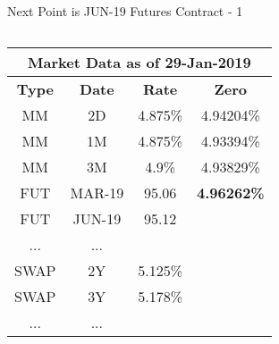\documentclass[handout, aspectratio=169]{beamer}
\begin{document}
\begin{frame}{Next Point is JUN-19 Futures Contract - 1}
	\begin{columns}[T]
		\begin{column}{0.4\textwidth}
			\begin{table}[t]
				\centering
				\begin{adjustbox}{max width=\textwidth, max height=\textheight}
					\begin{tabular}{|c|c|c|c|} 
						\hline
						\multicolumn{4}{|c|}{\textbf{Market Data as of 29-Jan-2019}} \\
						\hline
						\textbf{Type} & \textbf{Date}  & \textbf{Rate} & \textbf{Zero}\\				
						\hline
						MM & 2D & 4.875\% & 4.94204\% \\
						MM & 1M & 4.875\% & 4.93394\% \\
						MM & 3M & 4.9\% & 4.93829\%\\
						\hline
						FUT & MAR-19 & 95.06 & \textbf{4.96262\%}\\
						FUT & JUN-19 & 95.12 &\\
						... & ... & &\\
						\hline
						SWAP & 2Y & 5.125\% &\\
						SWAP & 3Y & 5.178\% &\\
						... & ... & &\\
						\hline
					\end{tabular}
				\end{adjustbox}
			\end{table}
		\end{column}
		

\end{columns}
\end{frame}
\end{document}
